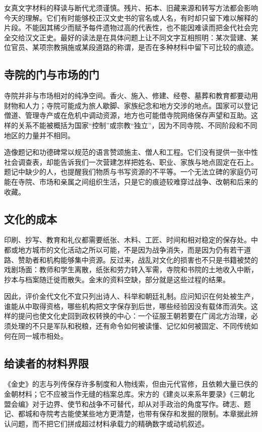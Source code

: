 女真文字材料的释读与断代尤须谨慎。残片、拓本、旧藏来源和转写方法都会影响今天的理解。它们有时能够校正汉文史书的官名或人名，有时却只留下难以解释的片段。不能因其稀少而赋予每件遗物过高的代表性，也不能因难读而把金代社会完全交给汉文正史。最好的读法是在具体问题上让不同文字互相照明：某次营建、某位官员、某项宗教捐施或某段道路的称谓，是否在多种材料中留下可比较的痕迹。

\subsection{寺院的门与市场的门}

寺院并非与市场相对的纯净空间。香火、施入、修建、经卷、墓葬和教育都要动用财物和人力；寺院可能成为旅人歇脚、家族纪念和地方交涉的地点。国家可以登记僧道、管理寺产或在危机中调动资源，地方也可能借寺院网络保存声望和互助。这样的关系不能被概括为国家“控制”或宗教“独立”，因为不同寺院、不同阶段和不同地区的力量并不相同。

造像题记和功德碑常以规范的语言赞颂施主、僧人和工程。它们没有提供一张中性社会调查表，却能告诉我们一次营建怎样把姓名、职业、家族与地点固定在石上。题记中缺少的人，也提醒我们物质与书写资源的不平等。一个无法立碑的家庭仍可能在寺院、市场和亲属之间组织生活，只是它的痕迹较难穿过战争、改朝和后来的收藏。

\subsection{文化的成本}

印刷、抄写、教育和礼仪都需要纸张、木料、工匠、时间和相对稳定的保存处。中都或地方城市的文化活动之所以可能，不是因为战争消失，而是因为仍有若干道路、赞助者和机构能够集中资源。反过来，战乱对文化的损害也不只是书籍被焚的戏剧场面：教师和学生离散，纸张和劳力转入军需，寺院和书院的土地收入中断，抄本与档案随迁徙而散失。金末的资料空缺，部分就是这些过程的结果。

因此，评价金代文化不宜只列出诗人、科举和朝廷礼制。应问知识在何处被生产，谁能从中取得资格，哪些机构把文字保存到后世，哪些经验因没有载体而消失。这样的提问也使文化史回到政权转换的中心：一个征服王朝若要在广阔北方治理，必须处理的不只是军队和税粮，还有命令如何被读懂、记忆如何被固定、不同传统如何在同一城市相处。

\subsection{给读者的材料界限}

《金史》的志与列传保存许多制度和人物线索，但由元代官修，且依赖大量已佚的金朝材料；它不应被当作无缝的档案总库。宋方的《建炎以来系年要录》《三朝北盟会编》对于边界、使节和战争不可替代，却从对手政治的角度写作。碑志、题记、都城和寺院考古能使某些地方更清楚，也带有保存和发掘的限制。本章据此辨认问题，而不把它们拼成超过材料承载力的精确数字或动机叙述。
